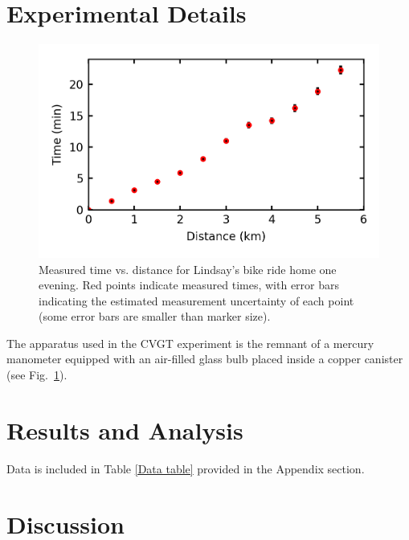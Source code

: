 \documentclass[12pt]{article}
\begin{document}
\section{Experimental Details}

\begin{figure}[h!]
    \centering  \includegraphics{BikeRidePlot.png}
  \caption{Measured time vs. distance for Lindsay's bike ride home one evening. Red points indicate measured times, with error bars indicating the estimated measurement uncertainty of each point (some error bars are smaller than marker size).}
  \label{fig:setup}
\end{figure}

The apparatus used in the CVGT experiment is the remnant of a mercury manometer equipped with an air-filled glass bulb placed inside a copper canister (see Fig.\ \ref{fig:setup}).  



\section{Results and Analysis}

Data is included in Table \ref{Data table} provided in the Appendix section.

\section{Discussion}
\end{document}
